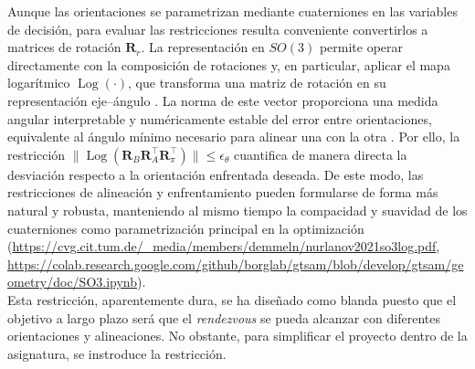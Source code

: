 \begin{itemize}
  Aunque las orientaciones se parametrizan mediante cuaterniones en las variables de decisión, 
  para evaluar las restricciones resulta conveniente convertirlos a matrices de rotación $\mathbf{R}_r$. La 
  representación en $SO(3)$ permite operar directamente con la composición de rotaciones y, 
  en particular, aplicar el mapa logarítmico $\operatorname{Log}(\cdot)$, que transforma una 
  matriz de rotación en su representación eje–ángulo \cite{murray1994mathematical}. La norma de este vector proporciona una 
  medida angular interpretable y numéricamente estable del error entre orientaciones, equivalente
  al ángulo mínimo necesario para alinear una con la otra \cite{barfoot2014associating}. Por ello, la restricción 
  $\|\operatorname{Log}(\mathbf{R}_B \mathbf{R}_A^\top \mathbf{R}_{\pi}^\top)\|\le \epsilon_{\theta}$ 
  cuantifica de manera directa la desviación respecto a la orientación enfrentada deseada. De este
  modo, las restricciones de alineación y enfrentamiento pueden formularse de forma más natural y
  robusta, manteniendo al mismo tiempo la compacidad y suavidad de los cuaterniones como 
  parametrización principal en la optimización (\url{https://cvg.cit.tum.de/_media/members/demmeln/nurlanov2021so3log.pdf},
  \url{https://colab.research.google.com/github/borglab/gtsam/blob/develop/gtsam/geometry/doc/SO3.ipynb}). \\


  

  Esta restricción, aparentemente dura, se ha diseñado como blanda puesto que el objetivo a largo
  plazo será que el \textit{rendezvous} se pueda alcanzar con diferentes orientaciones y alineaciones.
  No obstante, para simplificar el proyecto dentro de la asignatura, se instroduce la restricción.


\end{itemize}
